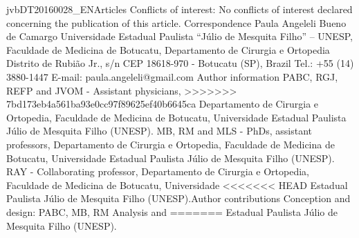 \documentclass[numberinsection,times,10pt,spreadimages]{memoir}
\begin{document}
jvbDT20160028\_{}ENArticles
Conflicts of interest: No conflicts of interest declared concerning the
publication of this article.
\label{*}
Correspondence Paula Angeleli Bueno de Camargo Universidade
Estadual Paulista “Júlio de Mesquita Filho” – UNESP, Faculdade de Medicina de
Botucatu, Departamento de Cirurgia e Ortopedia Distrito de Rubião Jr., s/n CEP
18618-970 - Botucatu (SP), Brazil Tel.: +55 (14) 3880-1447 E-mail:
paula.angeleli@gmail.com
Author information PABC, RGJ, REFP and JVOM - Assistant physicians,
>>>>>>> 7bd173eb4a561ba93e0cc97f89625ef40b6645ca
Departamento de Cirurgia e Ortopedia, Faculdade de Medicina de Botucatu,
Universidade Estadual Paulista Júlio de Mesquita Filho (UNESP). MB, RM and
MLS - PhDs, assistant professors, Departamento de Cirurgia e Ortopedia,
Faculdade de Medicina de Botucatu, Universidade Estadual Paulista Júlio de
Mesquita Filho (UNESP). RAY - Collaborating professor, Departamento de
Cirurgia e Ortopedia, Faculdade de Medicina de Botucatu, Universidade
<<<<<<< HEAD
Estadual Paulista Júlio de Mesquita Filho (UNESP).Author contributions
Conception and design: PABC, MB, RM Analysis and
=======
Estadual Paulista Júlio de Mesquita Filho (UNESP).
\end{document}
